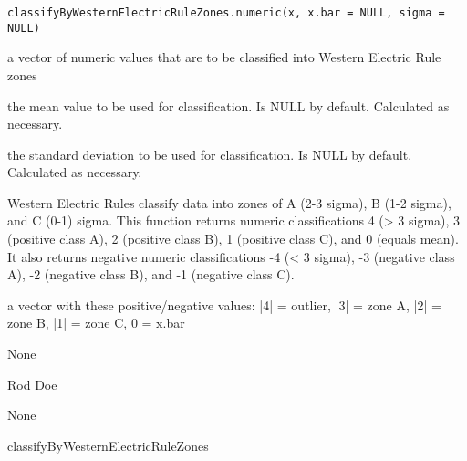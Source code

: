 \documentclass[a4paper]{book}
\begin{document}
%
\begin{Usage}
\begin{verbatim}
classifyByWesternElectricRuleZones.numeric(x, x.bar = NULL, sigma = NULL)
\end{verbatim}
\end{Usage}
%
\begin{Arguments}
\begin{ldescription}
\item[\code{x}] 
a vector of numeric values that are to be classified into Western Electric Rule zones

\item[\code{x.bar}] 
the mean value to be used for classification.  Is NULL by default.  Calculated as necessary.

\item[\code{sigma}] 
the standard deviation to be used for classification.  Is NULL by default.  Calculated as necessary.

\end{ldescription}
\end{Arguments}
%
\begin{Details}\relax
Western Electric Rules classify data into zones of A (2-3 sigma), B (1-2 sigma), and C (0-1) sigma.
This function returns numeric classifications 4 (> 3 sigma), 3 (positive class A), 2 (positive class B), 1 (positive class C), and 0 (equals mean).
It also returns negative numeric classifications -4 (< 3 sigma), -3 (negative class A), -2 (negative class B), and -1 (negative class C).
\end{Details}
%
\begin{Value}
a vector with these positive/negative values: |4| = outlier, |3| = zone A, |2| = zone B, |1| = zone C, 0 = x.bar

\end{Value}
%
\begin{Note}\relax
None
\end{Note}
%
\begin{Author}\relax
Rod Doe
\end{Author}
%
\begin{References}\relax
None
\end{References}
%
\begin{SeeAlso}\relax
classifyByWesternElectricRuleZones
\end{SeeAlso}
%
\end{document}
